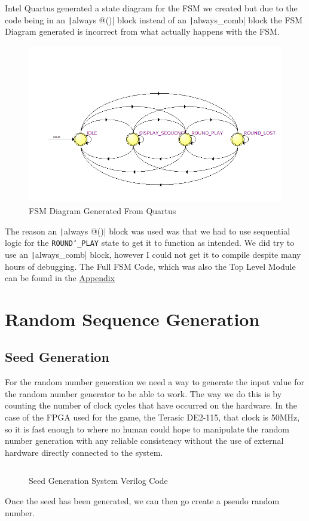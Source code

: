 \documentclass{report}
\begin{document}
Intel Quartus generated a state diagram for the FSM we created but due to the code being in an \texttt|always @()| block instead of an \texttt|always_comb| block the FSM Diagram generated is incorrect from what actually happens with the FSM.
\begin{figure}[H]
    \begin{center}
    \includegraphics[scale = 0.9]{images/image2.png}
    \end{center}
    \caption{FSM Diagram Generated From Quartus}
\end{figure}
The reason an \texttt|always @()| block was used was that we had to use sequential logic for the \texttt{ROUND\char`_PLAY} state to get it to function as intended. We did try to use an \texttt|always_comb| block, however I could not get it to compile despite many hours of debugging. The Full FSM Code, which was also the Top Level Module can be found in the \hyperlink{fsm_code}{Appendix}


\newpage
\section{Random Sequence Generation}
\subsection{Seed Generation}
For the random number generation we need a way to generate the input value for the random number generator to be able to work. The way we do this is by counting the number of clock cycles that have occurred on the hardware. In the case of the FPGA used for the game, the Terasic DE2-115, that clock is 50MHz, so it is fast enough to where no human could hope to manipulate the random number generation with any reliable consistency without the use of external hardware directly connected to the system.
\begin{figure}[H]
    \inputminted{sv}{../seedgenerator.sv}
    \caption{Seed Generation System Verilog Code}
\end{figure} 
Once the seed has been generated, we can then go create a pseudo random number.
\end{document}
